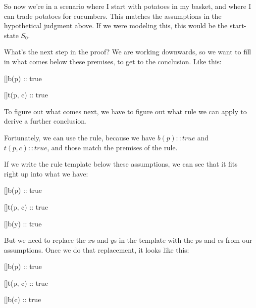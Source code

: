\documentclass[../../../main.tex]{subfiles}
\begin{document}
\noindent
So now we're in a scenario where I start with potatoes in my basket, and where I can trade potatoes for cucumbers. This matches the assumptions in the hypothetical judgment above. If we were modeling this, this would be the start-state $S_{0}$.

What's the next step in the proof? We are working downwards, so we want to fill in what comes below these premises, to get to the conclusion. Like this:

\begin{prooftree*}
  \hypo{}
  []{b(p) :: true}
  \ellipsis{}{}

  \hypo{}
  []{t(p, c) :: true}

  \ellipsis{}{}
  

\end{prooftree*}

\noindent
To figure out what comes next, we have to figure out what rule we can apply to derive a further conclusion. 

Fortunately, we can use the  rule, because we have $b(p) :: true$ and $t(p, c) :: true$, and those match the premises of the  rule.

If we write the  rule template below these assumptions, we can see that it fits right up into what we have:

\begin{prooftree*}
  \hypo{}
  []{b(p) :: true}


  \hypo{}
  []{t(p, c) :: true}


  []{b(y) :: true}

\end{prooftree*}

\noindent
But we need to replace the $x$s and $y$s in the template with the $p$s and $c$s from our assumptions. Once we do that replacement, it looks like this:

\begin{prooftree*}
  \hypo{}
  []{b(p) :: true}


  \hypo{}
  []{t(p, c) :: true}


  []{b(c) :: true}

\end{prooftree*}
\end{document}
